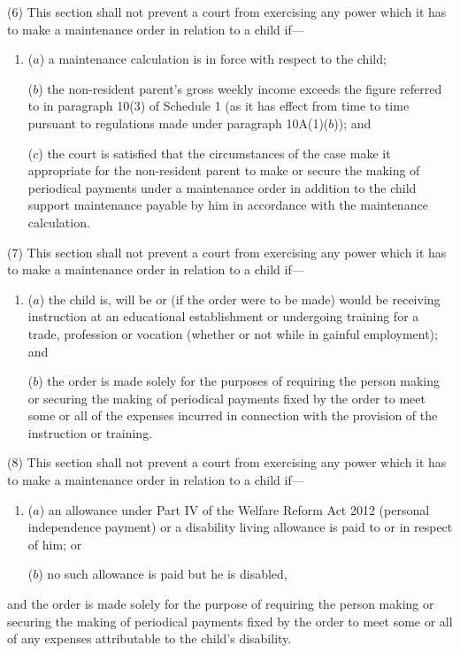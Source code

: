 \documentclass[a4paper]{article}
\begin{document}
(6)
This section shall not prevent a court from exercising any power which it
has to make a maintenance order in relation to a child if---
\begin{enumerate}\item[]
($a$)
a maintenance calculation
is in force with respect
to the child;

($b$) the non-resident parent’s gross weekly income exceeds the figure
referred to in paragraph 10(3) of Schedule 1 (as it has effect from time to
time pursuant to regulations made under paragraph 10A(1)($b$)); and

($c$)
the court is satisfied that the circumstances of the case make it appropriate for the non-resident parent
to make or secure the making
of periodical payments under a maintenance order in addition to the child
support maintenance payable by him in accordance with the maintenance calculation.
\end{enumerate}

(7)
This section shall not prevent a court from exercising any power which it
has to make a maintenance order in relation to a child if---
\begin{enumerate}\item[]
($a$)
the child is, will be or (if the order were to be made) would be receiving
instruction at an educational establishment or undergoing training for a
trade, profession or vocation (whether or not while in gainful employment); and

($b$)
the order is made solely for the purposes of requiring the person making
or securing the making of periodical payments fixed by the order to meet
some or all of the expenses incurred in connection with the provision of
the instruction or training.
\end{enumerate}

(8)
This section shall not prevent a court from exercising any power which it
has to make a maintenance order in relation to a child if---
\begin{enumerate}\item[]
($a$) an allowance under Part IV of the Welfare Reform Act 2012 (personal independence payment) or
a disability living allowance is paid to or in respect of him; or

($b$)
no such allowance is paid but he is disabled,
\end{enumerate}
and the order is made solely for the purpose of requiring the person making or
securing the making of periodical payments fixed by the order to meet some or all
of any expenses attributable to the child’s disability.
\end{document}
